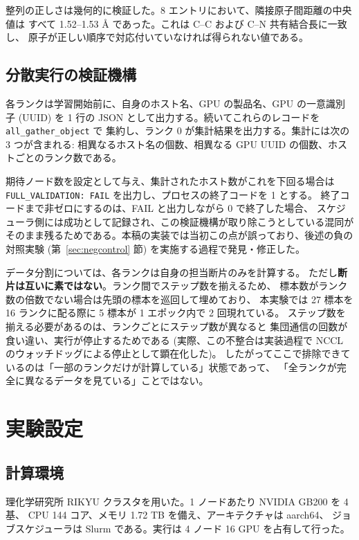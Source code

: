 \documentclass[11pt,a4paper]{article}
\begin{document}
整列の正しさは幾何的に検証した。8 エントリにおいて、隣接原子間距離の中央値は
すべて 1.52--1.53 \AA{} であった。これは C--C および C--N 共有結合長に一致し、
原子が正しい順序で対応付いていなければ得られない値である。

\subsection{分散実行の検証機構}

各ランクは学習開始前に、自身のホスト名、GPU の製品名、GPU の一意識別子 (UUID) を
1 行の JSON として出力する。続いてこれらのレコードを \texttt{all\_gather\_object} で
集約し、ランク 0 が集計結果を出力する。集計には次の 3 つが含まれる:
相異なるホスト名の個数、相異なる GPU UUID の個数、ホストごとのランク数である。

期待ノード数を設定として与え、集計されたホスト数がこれを下回る場合は
\texttt{FULL\_VALIDATION: FAIL} を出力し、プロセスの終了コードを 1 とする。
終了コードまで非ゼロにするのは、FAIL と出力しながら 0 で終了した場合、
スケジューラ側には成功として記録され、この検証機構が取り除こうとしている混同が
そのまま残るためである。本稿の実装では当初この点が誤っており、後述の負の対照実験
(第~\ref{sec:negcontrol} 節) を実施する過程で発見・修正した。

データ分割については、各ランクは自身の担当断片のみを計算する。
ただし\textbf{断片は互いに素ではない}。ランク間でステップ数を揃えるため、
標本数がランク数の倍数でない場合は先頭の標本を巡回して埋めており、
本実験では 27 標本を 16 ランクに配る際に 5 標本が 1 エポック内で 2 回現れている。
ステップ数を揃える必要があるのは、ランクごとにステップ数が異なると
集団通信の回数が食い違い、実行が停止するためである
(実際、この不整合は実装過程で NCCL のウォッチドッグによる停止として顕在化した)。
したがってここで排除できているのは「一部のランクだけが計算している」状態であって、
「全ランクが完全に異なるデータを見ている」ことではない。

\section{実験設定}

\subsection{計算環境}

理化学研究所 RIKYU クラスタを用いた。1 ノードあたり NVIDIA GB200 を 4 基、
CPU 144 コア、メモリ 1.72 TB を備え、アーキテクチャは aarch64、
ジョブスケジューラは Slurm である。実行は 4 ノード 16 GPU を占有して行った。
\end{document}
